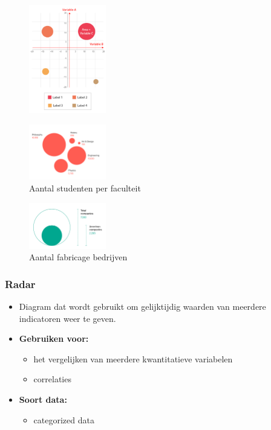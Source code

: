 \documentclass{article}
\newcommand{\bold}[1]{\textbf{#1}}
\begin{document}
\begin{figure}[H]
    \centering
    \includegraphics[width=0.3\textwidth]{dv-bubble1.png}
    \caption{}
\end{figure}
\begin{figure}[H]
    \centering
    \includegraphics[width=0.3\textwidth]{dv-bubble2.png}
    \caption{Aantal studenten per faculteit}
\end{figure}
\begin{figure}[H]
    \centering
    \includegraphics[width=0.3\textwidth]{dv-bubble3.png}
    \caption{Aantal fabricage bedrijven}
\end{figure}

\subsubsection{Radar}

\begin{itemize}
    \item Diagram dat wordt gebruikt om gelijktijdig waarden van meerdere indicatoren weer te geven.
    \item \bold{Gebruiken voor:}
    \begin{itemize}
        \item het vergelijken van meerdere kwantitatieve variabelen
        \item correlaties
    \end{itemize}
    \item \bold{Soort data:}
    \begin{itemize}
        \item categorized data
    \end{itemize}
\end{itemize}
\end{document}
